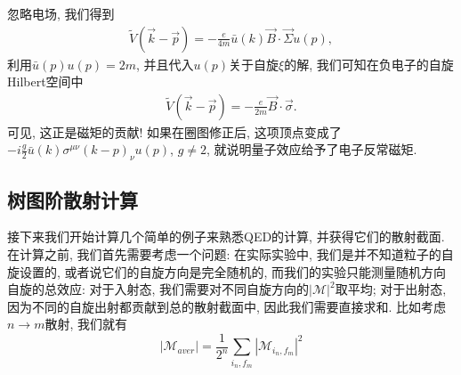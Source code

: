 忽略电场, 我们得到
\begin{align}
    \tilde V(\vec k-\vec p)=-\frac{e}{4m}\bar u(k)\vec B\cdot\vec\Sigma u(p),
\end{align}
利用$\bar u(p)u(p)=2m$, 并且代入$u(p)$关于自旋$\xi$的解, 我们可知在负电子的自旋Hilbert空间中
\begin{align}
    \tilde V(\vec k-\vec p)=-\frac{e}{2m}\vec B\cdot\vec\sigma.
\end{align}
可见, 这正是磁矩的贡献! 如果在圈图修正后, 这项顶点变成了$-i\frac g2\bar u(k)\sigma^{\mu\nu}(k-p)_\nu u(p)$, $g\neq 2$, 就说明量子效应给予了电子反常磁矩.

\subsection{树图阶散射计算}
接下来我们开始计算几个简单的例子来熟悉QED的计算, 并获得它们的散射截面. 在计算之前, 我们首先需要考虑一个问题: 在实际实验中, 我们是并不知道粒子的自旋设置的, 或者说它们的自旋方向是完全随机的, 而我们的实验只能测量随机方向自旋的总效应: 对于入射态, 我们需要对不同自旋方向的$|\mathcal M|^2$取平均; 对于出射态, 因为不同的自旋出射都贡献到总的散射截面中, 因此我们需要直接求和. 比如考虑$n\to m$散射, 我们就有
\begin{equation}
    |\mathcal M_{aver}|=\frac1{2^n}\sum_{i_n, f_m}|\mathcal M_{i_n, f_m}|^2
\end{equation}
